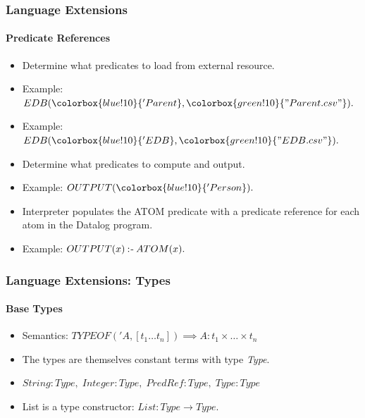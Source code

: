 \documentclass{beamer}
\newcommand{\coloneqtwo}{\mathbin{:\hspace{-0.5ex}\textsf{-}}}
\newcommand{\strconst}[1]{ \colorbox{green!10}{#1} }
\newcommand{\predconst}[1]{ \colorbox{blue!10}{#1} }
\begin{document}
\begin{frame}
\frametitle{Language Extensions}
\framesubtitle{Predicate References}
\begin{itemize}
\item<2->Determine what predicates to load from external resource.
\item<3->Example: $EDB(\predconst{'Parent}, \strconst{"Parent.csv"}).$
\item<4->Example: $EDB(\predconst{'EDB}, \strconst{"EDB.csv"}).$
\end{itemize}

\begin{itemize}
\item<6->Determine what predicates to compute and output. 
\item<7->Example: $OUTPUT(\predconst{'Person}). $
\end{itemize}

\begin{itemize}
\item<9->Interpreter populates the ATOM predicate with a predicate reference for each atom in the Datalog program.
\item<10->Example: $OUTPUT(x) \coloneqtwo ATOM(x).$
\end{itemize}
\end{frame}
\begin{frame}
\frametitle{Language Extensions: Types}
\framesubtitle{Base Types}
\begin{itemize}
\item<2-> Semantics:  $TYPEOF('A, [t_1  \ldots  t_n]) \implies A : t_1 \times \ldots \times t_n$
\item<3-> The types are themselves constant terms with type \textit{Type}.
\item<4-> $String : Type, \; Integer : Type, \; PredRef : Type, \; Type : Type$
\item<5-> List is a type constructor: $List : Type \rightarrow Type$.\\
\end{itemize}
\end{frame}
\end{document}
